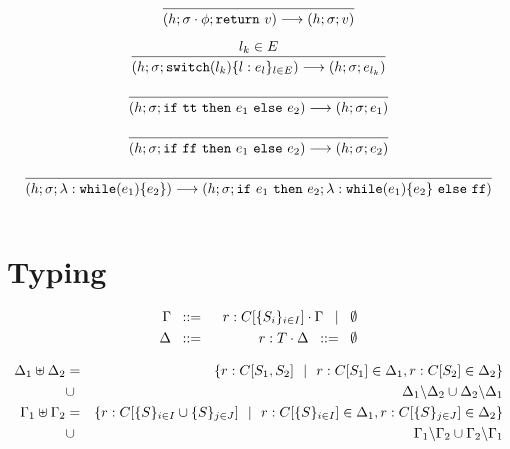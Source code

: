 \documentclass[a4paper]{llncs}
\newcommand{\return}[1]{\ensuremath{\mathtt{return}}\ #1}
\newcommand{\switch}[2]{\ensuremath{\mathtt{switch}(#1)\set{#2}}}
\newcommand{\while}[2]{\ensuremath{\mathtt{while}(#1)\set{#2}}}
\begin{document}
\[\begin{array}{c}
		\tree{}{(h;\sigma \cat \phi; \return{v}) \red (h;\sigma;v)}
		\\[6mm]

		\tree{
			l_k \in E
		}{
			(h;\sigma;\switch{l_k}{l: e_l}_{l \in E}) \red (h;\sigma; e_{l_k})
		}\\[6mm]

		\tree{
		}{
			(h; \sigma; \ifthenelse{\true}{e_1}{e_2}) \red (h; \sigma; e_1)
		}
		\\[6mm]

		\tree{
		}{
			(h; \sigma; \ifthenelse{\false}{e_1}{e_2}) \red (h; \sigma; e_2)
		}
		\\[6mm]

		\tree{
		}{
			(h; \sigma; \lambda: \while{e_1}{e_2}) \red (h; \sigma; \ifthenelse{e_1}{e_2 ;\lambda: \while{e_1}{e_2}}{\false})
		}
		\\[6mm]

	\end{array}
\]

\section{Typing}

\begin{eqnarray*}
	\Gamma &\;\;::=\;\;& r: C[\{S_i\}_{i \in I}] \cdot \Gamma \;\;\;|\;\;\; \emptyset\\
	\Delta &\;\;::=\;\;& r: T \cdot \Delta \;\;::=\;\; \emptyset 
\end{eqnarray*}

\begin{eqnarray*}
	\Delta_1 \uplus \Delta_2	&=&	\{r: C[S_1, S_2] \ \ |\ \  r: C[S_1] \in \Delta_1, r: C[S_2] \in \Delta_2\}\\
					&\cup&	\Delta_1\backslash\Delta_2 \cup \Delta_2\backslash\Delta_1\\
	\Gamma_1 \uplus \Gamma_2	&=&	\{r: C[\{S\}_{i \in I} \cup \{S\}_{j \in J}] \ \ |\ \  r: C[\{S\}_{i \in I}] \in \Delta_1, r: C[\{S\}_{j \in J}] \in \Delta_2\}\\
					&\cup&	\Gamma_1\backslash\Gamma_2 \cup \Gamma_2\backslash\Gamma_1
\end{eqnarray*}
\end{document}
